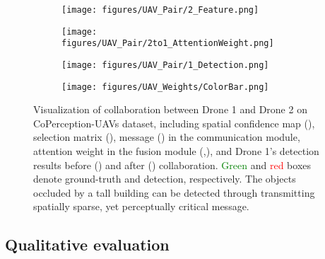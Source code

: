 \documentclass{article}
\begin{document}
\begin{figure}[!t]
\begin{subfigure}{0.18\linewidth}
    \texttt{[image: figures/UAV\_Pair/2\_Feature.png]}
    \vspace{-5mm}
    \caption{}
    \label{fig:UAV_Message2}
  \end{subfigure}
  \begin{subfigure}{0.18\linewidth}
    \texttt{[image: figures/UAV\_Pair/2to1\_AttentionWeight.png]}
    \vspace{-5mm}
    \caption{}
    \label{fig:UAV_AttenWeight2to1}
  \end{subfigure}
\begin{subfigure}{0.18\linewidth}
    \texttt{[image: figures/UAV\_Pair/1\_Detection.png]}
    \vspace{-5mm}
    \caption{}
    \label{fig:UAV_DetectionAfterComm}
  \end{subfigure}
  \begin{subfigure}{0.04\linewidth}
    \texttt{[image: figures/UAV\_Weights/ColorBar.png]}
\end{subfigure}
\vspace{-2mm}
  \caption{Visualization of collaboration between Drone 1 and Drone 2 on CoPerception-UAVs dataset, including spatial confidence map (), selection matrix (), message () in the communication module, attention weight in the fusion module (,), and Drone 1's detection results before () and after () collaboration. \textcolor{green}{Green} and \textcolor{red}{red} boxes denote ground-truth and detection, respectively. The objects occluded by a tall building can be detected through transmitting spatially sparse, yet perceptually critical message. }
  \label{fig:UAV_Weights}
  \vspace{-4mm}
\end{figure}

\vspace{-2mm}
\subsection{Qualitative evaluation}
\vspace{-2mm}
\end{document}
